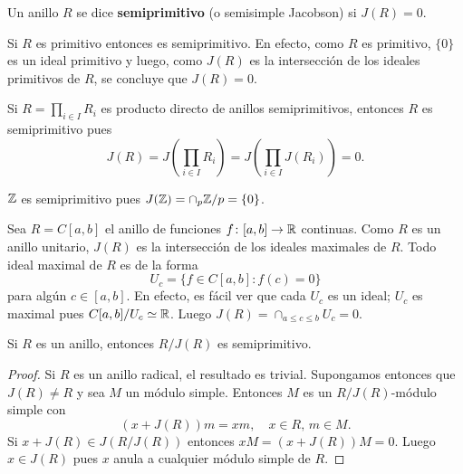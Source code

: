 
\begin{definition}
	Un anillo $R$ se dice \textbf{semiprimitivo} (o semisimple Jacobson) si
	$J(R)=0$.
\end{definition}

\begin{example}
	Si $R$ es primitivo entonces es semiprimitivo. En efecto, como $R$ es
	primitivo, $\{0\}$ es un ideal primitivo y luego, como $J(R)$ es la
	intersección de los ideales primitivos de $R$, se concluye que $J(R)=0$.
\end{example}

\begin{example}
	Si $R=\prod_{i\in I}R_i$ es producto directo de anillos semiprimitivos,
	entonces $R$ es semiprimitivo pues 
	\[
		J(R)=J\left(\prod_{i\in I}R_i\right)=J\left(\prod_{i\in I}J(R_i)\right)=0.
	\]
\end{example}

\begin{example}
	$\mathbb{Z}$ es semiprimitivo pues $J(\mathbb{Z})=\cap_{p}\mathbb{Z}/p=\{0\}$.
\end{example}

\begin{example}
	Sea $R=C[a,b]$ el anillo de funciones $f\colon [a,b]\to\mathbb{R}$ continuas. Como
	$R$ es un anillo unitario, $J(R)$ es la intersección de los ideales
	maximales de $R$. Todo ideal maximal de $R$ es de la forma
	\[
		U_c=\{f\in C[a,b]:f(c)=0\}
	\]
	para algún $c\in[a,b]$. En efecto, es fácil ver que cada $U_c$ es un ideal;
	$U_c$ es maximal pues $C[a,b]/U_c\simeq\mathbb{R}$.  Luego $J(R)=\cap_{a\leq c\leq
	b}U_c=0$.
\end{example}

\begin{theorem}
	\label{thm:semiprimitivo}
	Si $R$ es un anillo, entonces $R/J(R)$ es semiprimitivo. 
\end{theorem}

\begin{proof}
	Si $R$ es un anillo radical, el resultado es trivial. Supongamos entonces
	que $J(R)\ne R$ y sea $M$ un módulo simple. Entonces $M$ es un
	$R/J(R)$-módulo simple con
	\[
		(x+J(R))m=xm,\quad
		x\in R,\,m\in M.
	\]
	Si $x+J(R)\in J(R/J(R))$ entonces $xM=(x+J(R))M=0$. Luego $x\in J(R)$ pues
	$x$ anula a cualquier módulo simple de $R$.
\end{proof}

